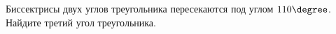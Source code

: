 \begin{ex}
	\begin{condition}
		Биссектрисы двух углов треугольника пересекаются под углом \( 110\degree \). Найдите третий угол треугольника.
	\end{condition}
	\answer{\( 40\degree \)}
\end{ex}